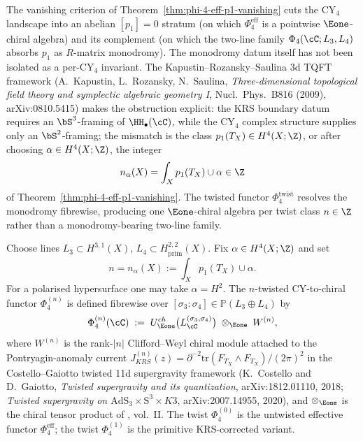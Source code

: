 The vanishing criterion of Theorem~\ref{thm:phi-4-eff-p1-vanishing} cuts the
CY${}_4$ landscape into an abelian $[p_1] = 0$ stratum (on which
$\Phi_4^{\mathrm{eff}}$ is a pointwise $\Eone$-chiral algebra) and its
complement (on which the two-line family \(\Phi_4(\cC;L_3,L_4)\) absorbs
$p_1$ as $R$-matrix monodromy). The monodromy datum itself has not been
isolated as a per-CY${}_4$ invariant. The Kapustin--Rozansky--Saulina 3d
TQFT framework (A.\ Kapustin, L.\ Rozansky, N.\ Saulina,
\emph{Three-dimensional topological field theory and symplectic algebraic
geometry I}, Nucl.\ Phys.\ B816 (2009), arXiv:0810.5415) makes the
obstruction explicit: the KRS boundary datum requires an $\bS^3$-framing of
$\HH_\bullet(\cC)$, while the CY${}_4$ complex structure supplies only an
$\bS^2$-framing; the mismatch is the class \(p_1(T_X)\in H^4(X;\Z)\),
or after choosing \(\alpha\in H^4(X;\Z)\), the integer
\[
 n_\alpha(X)=\int_X p_1(T_X)\cup\alpha\in\Z
\]
of Theorem~\ref{thm:phi-4-eff-p1-vanishing}.
The twisted functor \(\Phi_4^{\mathrm{twist}}\) resolves the monodromy
fibrewise, producing one \(\Eone\)-chiral algebra per twist class \(n\in\Z\)
rather than a monodromy-bearing two-line family.

\begin{definition}
\label{def:phi-4-twist}
%
Choose lines \(L_3\subset H^{3,1}(X)\), \(L_4\subset
H^{2,2}_{\mathrm{prim}}(X)\). Fix \(\alpha\in H^4(X;\Z)\) and set
\[
 n=n_\alpha(X):=\int_X p_1(T_X)\cup\alpha.
\]
For a polarised hypersurface one may take \(\alpha=H^2\). The \(n\)-twisted CY-to-chiral functor
$\Phi_4^{(n)}$ is defined fibrewise over
\([\sigma_3 : \sigma_4] \in \mathbb{P}(L_3\oplus L_4)\) by
\begin{equation}
\label{eq:phi-4-twist-def}
 \Phi_4^{(n)}(\cC)
 \;:=\; U^{ch}_{\Eone}\bigl(L^{(\sigma_3, \sigma_4)}_\cC\bigr)
 \;\otimes_{\Eone}\; W^{(n)},
\end{equation}
where $W^{(n)}$ is the rank-$|n|$ Clifford--Weyl chiral module attached to
the Pontryagin-anomaly current
$J^{(n)}_{KRS}(z) = \partial^{-2}\mathrm{tr}(F_{T_X} \wedge F_{T_X})/(2\pi)^2$
in the Costello--Gaiotto twisted 11d supergravity framework
\textup{(}K.\ Costello and D.\ Gaiotto, \emph{Twisted supergravity and its
quantization}, arXiv:1812.01110, 2018; \emph{Twisted supergravity on
$\mathrm{AdS}_3 \times \mathrm{S}^3 \times K3$}, arXiv:2007.14955,
2020\textup{)}, and $\otimes_{\Eone}$ is the chiral tensor product of
\cite{CostelloGwilliam}, vol.\ II. The twist $\Phi_4^{(0)}$ is the untwisted
effective functor $\Phi_4^{\mathrm{eff}}$; the twist $\Phi_4^{(1)}$
is the primitive KRS-corrected variant.
\end{definition}

